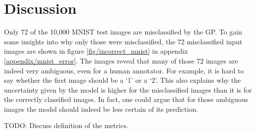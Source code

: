 \documentclass{article}
\begin{document}
\section{Discussion}
Only 72 of the 10,000 MNIST test images are misclassified by the GP. To gain some insights into why only those were misclassified, the 72 misclassified input images are shown in figure \ref{fig/incorrect_mnist} in appendix \ref{appendix/mnist_error}. The images reveal that many of those 72 images are indeed very ambiguous, even for a human annotator. For example, it is hard to say whether the first image should be a `1' or a `2'. This also explains why the uncertainty given by the model is higher for the misclassified images than it is for the correctly classified images. In fact, one could argue that for those ambiguous images the model should indeed be less certain of its prediction.

TODO: Discuss definition of the metrics.
\end{document}
